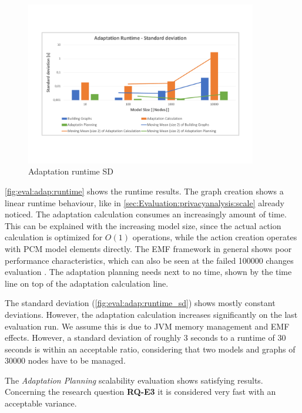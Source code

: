 \begin{figure}[h]
	\centering
	\includegraphics[trim = 10mm 30mm 10mm 20mm, clip, width=0.90\textwidth]{graphs/Runtime_adapt_sd}
	\caption{Adaptation runtime SD}
	\label{fig:eval:adap:runtime_sd}
\end{figure}

\autoref{fig:eval:adap:runtime} shows the runtime results. The graph creation shows a linear runtime behaviour, like in \autoref{sec:Evaluation:privacyanalysis:scale} already noticed. The adaptation calculation consumes an increasingly amount of time. This can be explained with the increasing model size, since the actual action calculation is optimized for $O(1)$ operations, while the action creation operates with PCM model elements directly. The EMF framework in general shows poor performance characteristics, which can also be seen at the failed 100000 changes evaluation \cite{eclipse.org.2009}\cite{Steinberg.20050706}. The adaptation planning needs next to no time, shown by the time line on top of the adaptation calculation line.

The standard deviation (\autoref{fig:eval:adap:runtime_sd}) shows mostly constant deviations. However, the adaptation calculation increases significantly on the last evaluation run. We assume this is due to JVM memory management and EMF effects. However, a standard deviation of roughly 3 seconds to a runtime of 30 seconds is within an acceptable ratio, considering that two models and graphs of 30000 nodes have to be managed.

The \textit{Adaptation Planning} scalability evaluation shows satisfying results. Concerning the research question \textbf{RQ-E3} it is considered very fast with an acceptable variance.


